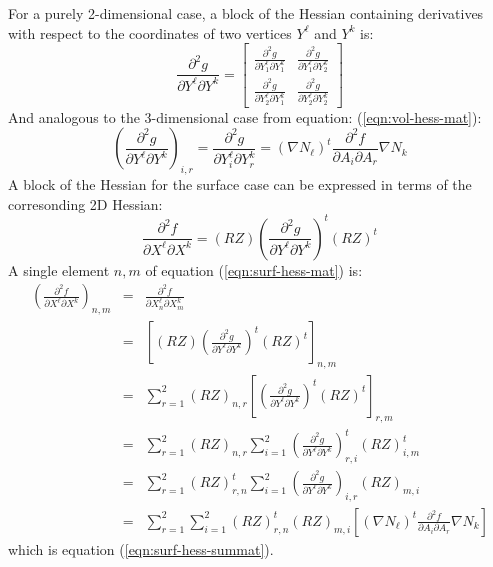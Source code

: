 \noindent For a purely 2-dimensional case, a block of the Hessian containing 
derivatives with respect to the coordinates of two vertices $Y^\ell$ and $Y^k$ is:
\begin{equation} \label{eqn:hess-2d}
\frac{\partial^2 g}{\partial Y^\ell \partial Y^k} =
\left[ \begin{array}{cc}
\frac{\partial^2 g}{\partial Y^\ell_1 \partial Y^k_1} &
\frac{\partial^2 g}{\partial Y^\ell_1 \partial Y^k_2} \\
\frac{\partial^2 g}{\partial Y^\ell_2 \partial Y^k_1} &
\frac{\partial^2 g}{\partial Y^\ell_2 \partial Y^k_2} 
\end{array} \right] \end{equation}
\noindent And analogous to the 3-dimensional case from equation:
(\ref{eqn:vol-hess-mat}):
\begin{equation}
\left(\frac{\partial^2 g}{\partial Y^\ell \partial Y^k}\right)_{i,r}
= \frac{\partial^2 g}{\partial Y^\ell_i \partial Y^k_r}
= (\nabla N_\ell)^t \frac{\partial^2 f}{\partial A_i \partial A_r} \nabla N_k
\end{equation}
\noindent A block of the Hessian for the surface case can be expressed in terms of the corresonding 2D Hessian:
\begin{equation} \label{eqn:surf-hess-mat}
\frac{\partial^2 f}{\partial X^\ell \partial X^k}
= (RZ) \left(\frac{\partial^2 g}{\partial Y^\ell \partial Y^k}\right)^t (RZ)^t
\end{equation}
\noindent A single element $n,m$ of equation (\ref{eqn:surf-hess-mat}) is:
\begin{eqnarray}
\left(\frac{\partial^2 f}{\partial X^\ell \partial X^k}\right)_{n,m}
&=& \frac{\partial^2 f}{\partial X^\ell_n \partial X^k_m} \nonumber \\
&=& \left[(RZ) \left(\frac{\partial^2 g}{\partial Y^\ell \partial Y^k} \right)^t  (RZ)^t\right]_{n,m} 
    \nonumber \\
&=& \sum_{r=1}^2 (RZ)_{n,r} \left[ \left(\frac{\partial^2 g}{\partial Y^\ell \partial Y^k} \right)^t
    (RZ)^t \right]_{r,m} \nonumber \\
&=& \sum_{r=1}^2 (RZ)_{n,r} \sum_{i=1}^2 
    \left(\frac{\partial^2 g}{\partial Y^\ell \partial Y^k}\right)^t_{r,i} (RZ)^t_{i,m} 
    \nonumber \\
&=& \sum_{r=1}^2 (RZ)^t_{r,n} \sum_{i=1}^2 
    \left(\frac{\partial^2 g}{\partial Y^\ell \partial Y^k}\right)_{i,r} (RZ)_{m,i} 
    \nonumber \\
&=& \sum_{r=1}^2 \sum_{i=1}^2 (RZ)^t_{r,n} (RZ)_{m,i} \left[
    (\nabla N_\ell)^t \frac{\partial^2 f}{\partial A_i \partial A_r} \nabla N_k
    \right] \nonumber
\end{eqnarray}
\noindent which is equation (\ref{eqn:surf-hess-summat}). \newline

